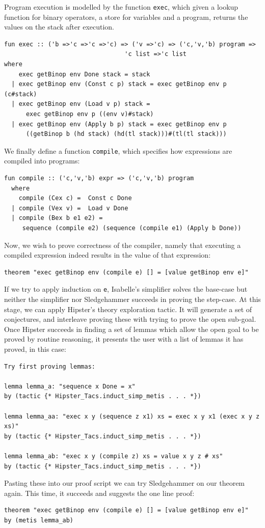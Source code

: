 Program execution is modelled by the function \texttt{exec}, which given a lookup function for binary operators, a store for variables and a program, returns the values on the stack after execution.
\begin{small}
\begin{verbatim}
fun exec :: ('b =>'c =>'c =>'c) => ('v =>'c) => ('c,'v,'b) program =>
								 'c list =>'c list
where
    exec getBinop env Done stack = stack
  | exec getBinop env (Const c p) stack = exec getBinop env p (c#stack) 
  | exec getBinop env (Load v p) stack = 
  	  exec getBinop env p ((env v)#stack)
  | exec getBinop env (Apply b p) stack = exec getBinop env p 
  	  ((getBinop b (hd stack) (hd(tl stack)))#(tl(tl stack)))
\end{verbatim}
\end{small}
We finally define a function \texttt{compile}, which specifies how expressions are compiled into programs:
\begin{small}
\begin{verbatim}
fun compile :: ('c,'v,'b) expr => ('c,'v,'b) program
  where
    compile (Cex c) =  Const c Done
  | compile (Vex v) =  Load v Done
  | compile (Bex b e1 e2) = 
     sequence (compile e2) (sequence (compile e1) (Apply b Done))
\end{verbatim}
\end{small}
Now, we wish to prove correctness of the compiler, namely that executing a compiled expression indeed results in the value of that expression: 
\begin{verbatim}
theorem "exec getBinop env (compile e) [] = [value getBinop env e]"
\end{verbatim}
If we try to apply induction on \texttt{e}, Isabelle's simplifier solves the base-case but neither the simplifier nor Sledgehammer succeeds in proving the step-case. At this stage, we can apply Hipster's theory exploration tactic. It will generate a set of conjectures, and interleave proving these with trying to prove the open sub-goal. Once Hipster succeeds in finding a set of lemmas which allow the open goal to be proved by routine reasoning, it presents the user with a list of lemmas it has proved, in this case:
\begin{small}
\begin{verbatim}
Try first proving lemmas:

lemma lemma_a: "sequence x Done = x"
by (tactic {* Hipster_Tacs.induct_simp_metis . . . *})

lemma lemma_aa: "exec x y (sequence z x1) xs = exec x y x1 (exec x y z xs)"
by (tactic {* Hipster_Tacs.induct_simp_metis . . . *})

lemma lemma_ab: "exec x y (compile z) xs = value x y z # xs"
by (tactic {* Hipster_Tacs.induct_simp_metis . . . *})
\end{verbatim}
\end{small}
Pasting these into our proof script we can try Sledgehammer on our theorem again. This time, it succeeds and suggests the one line proof:%
\begin{verbatim}
theorem "exec getBinop env (compile e) [] = [value getBinop env e]"
by (metis lemma_ab)
\end{verbatim}

